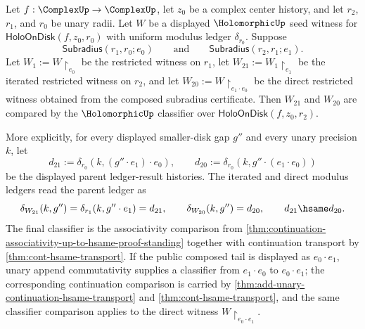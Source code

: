 \begin{theorem}
\label{thm:holo-on-disk-nested-subdisk-functoriality}
Let $f:\ComplexUp\to\ComplexUp$, let $z_0$ be a complex center history, and let $r_2$, $r_1$, and $r_0$ be unary radii. Let $W$ be a displayed $\HolomorphicUp$ seed witness for $\mathsf{HoloOnDisk}(f,z_0,r_0)$ with uniform modulus ledger $\delta_{r_0}$. Suppose
$$
\mathsf{Subradius}(r_1,r_0;e_0)\qquad\text{and}\qquad
\mathsf{Subradius}(r_2,r_1;e_1).
$$
Let $W_1:=W\!\restriction_{e_0}$ be the restricted witness on $r_1$, let $W_{21}:=W_1\!\restriction_{e_1}$ be the iterated restricted witness on $r_2$, and let $W_{20}:=W\!\restriction_{e_1\cdot e_0}$ be the direct restricted witness obtained from the composed subradius certificate. Then $W_{21}$ and $W_{20}$ are compared by the $\HolomorphicUp$ classifier over $\mathsf{HoloOnDisk}(f,z_0,r_2)$.

More explicitly, for every displayed smaller-disk gap $g''$ and every unary precision $k$, let
$$
d_{21}:=\delta_{r_0}(k,(g''\cdot e_1)\cdot e_0),
\qquad
 d_{20}:=\delta_{r_0}(k,g''\cdot(e_1\cdot e_0))
$$
be the displayed parent ledger-result histories. The iterated and direct modulus ledgers read the parent ledger as
$$
\delta_{W_{21}}(k,g'')=
\delta_{r_1}(k,g''\cdot e_1)=d_{21},
\qquad
\delta_{W_{20}}(k,g'')=d_{20},
\qquad
d_{21}\hsame d_{20}.
$$
The final classifier is the associativity comparison from \autoref{thm:continuation-associativity-up-to-hsame-proof-standing} together with continuation transport by \autoref{thm:cont-hsame-transport}. If the public composed tail is displayed as $e_0\cdot e_1$, unary append commutativity supplies a classifier from $e_1\cdot e_0$ to $e_0\cdot e_1$; the corresponding continuation comparison is carried by \autoref{thm:add-unary-continuation-hsame-transport} and \autoref{thm:cont-hsame-transport}, and the same classifier comparison applies to the direct witness $W\!\restriction_{e_0\cdot e_1}$.
\end{theorem}
